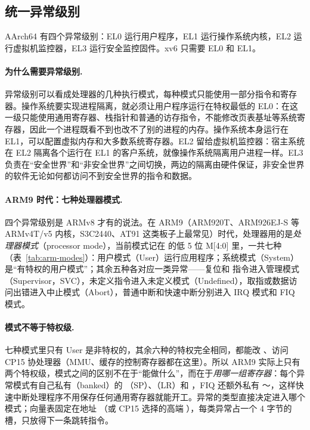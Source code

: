 \subsection{统一异常级别}
\label{sec:xv6-el}

AArch64 有四个异常级别：EL0 运行用户程序，EL1 运行操作系统内核，EL2 运行虚拟机监控器，EL3 运行安全监控固件。xv6 只需要 EL0 和 EL1。

\paragraph{为什么需要异常级别.} 异常级别可以看成处理器的几种执行模式，每种模式只能使用一部分指令和寄存器。操作系统要实现进程隔离，就必须让用户程序运行在特权最低的 EL0：在这一级只能使用通用寄存器、栈指针和普通的访存指令，不能修改页表基址等系统寄存器，因此一个进程既看不到也改不了别的进程的内存。操作系统本身运行在 EL1，可以配置虚拟内存和大多数系统寄存器。EL2 留给虚拟机监控器：宿主系统在 EL2 隔离各个运行在 EL1 的客户系统，就像操作系统隔离用户进程一样。EL3 负责在“安全世界”和“非安全世界”之间切换，两边的隔离由硬件保证，非安全世界的软件无论如何都访问不到安全世界的指令和数据。

\paragraph{ARM9 时代：七种处理器模式.} 四个异常级别是 ARMv8 才有的说法。在 ARM9（ARM920T、ARM926EJ-S 等 ARMv4T/v5 内核，S3C2440、AT91 这类板子上最常见）时代，处理器用的是\emph{处理器模式}（processor mode），当前模式记在  的低 5 位 M[4:0] 里，一共七种（表~\ref{tab:arm-modes}）：用户模式（User）运行应用程序；系统模式（System）是“有特权的用户模式”；其余五种各对应一类异常——复位和  指令进入管理模式（Supervisor，SVC），未定义指令进入未定义模式（Undefined），取指或数据访问出错进入中止模式（Abort），普通中断和快速中断分别进入 IRQ 模式和 FIQ 模式。

\paragraph{模式不等于特权级.} 七种模式里只有 User 是非特权的，其余六种的特权完全相同，都能改 、访问 CP15 协处理器（MMU、缓存的控制寄存器都在这里）。所以 ARM9 实际上只有两个特权级，模式之间的区别不在于“能做什么”，而在于\emph{用哪一组寄存器}：每个异常模式有自己私有（banked）的 （SP）、（LR）和 ，FIQ 还额外私有 ～，这样快速中断处理程序不用保存任何通用寄存器就能开工。异常的类型直接决定进入哪个模式；向量表固定在地址 （或 CP15 选择的高端 ），每类异常占一个 4 字节的槽，只放得下一条跳转指令。

